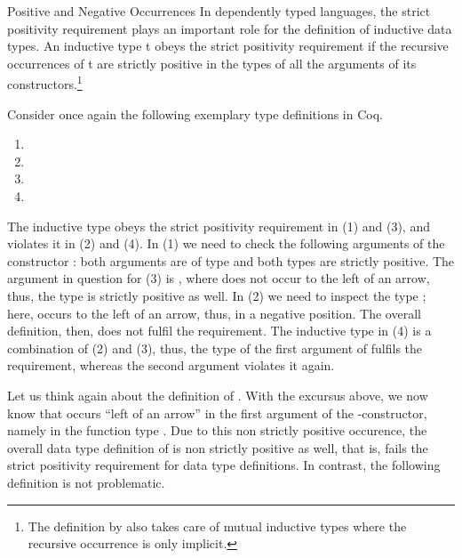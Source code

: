 \begin{excursus}{Positive and Negative Occurrences}
In dependently typed languages, the strict positivity requirement plays an important role for the definition of inductive data types.
An inductive type t obeys the strict positivity requirement if the recursive occurrences of t are strictly positive in the types of all the arguments of its constructors.\footnote{The definition by \citeauthor{blanqui2002inductivedatatype} also takes care of mutual inductive types where the recursive occurrence is only implicit.}

Consider once again the following exemplary type definitions in Coq.

\begin{enumerate}
\item[(1)] 
\item[(2)] 
\item[(3)] 
\item[(4)] 
\end{enumerate}

The inductive type  obeys the strict positivity requirement in (1) and (3), and violates it in (2) and (4).
In (1) we need to check the following arguments of the constructor : both arguments are of type  and both types are strictly positive.
The argument in question for (3) is , where  does not occur to the left of an arrow, thus, the type is strictly positive as well.
In (2) we need to inspect the type ; here,  occurs to the left of an arrow, thus, in a negative position.
The overall definition, then, does not fulfil the requirement.
The inductive type in (4) is a combination of (2) and (3), thus, the type of the first argument of  fulfils the requirement, whereas the second argument violates it again.
\end{excursus}

Let us think again about the definition of .
With the excursus above, we now know that  occurs ``left of an arrow''  in the first argument of the \--constructor, namely in the function type .
Due to this non strictly positive occurence, the overall data type definition of  is non strictly positive as well, that is, fails the strict positivity requirement for data type definitions.
In contrast, the following definition is not problematic.

